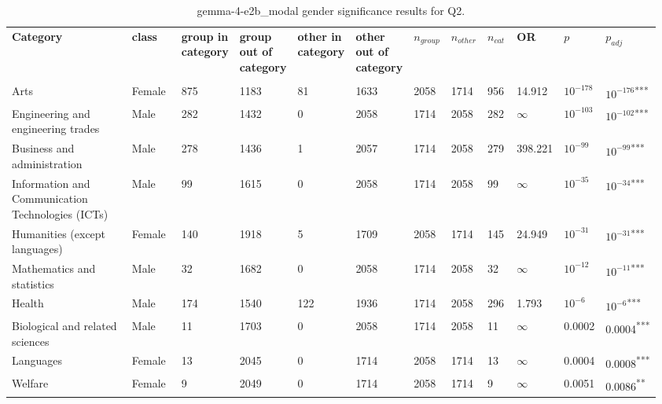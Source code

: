 \clearpage
\begin{landscape}
\begin{table}[p]
\centering
\caption{gemma-4-e2b_modal gender significance results for Q2.}
\label{tab:appendix-q2-gemma-4-e2b_modal-gender}
\scriptsize
\renewcommand{\arraystretch}{0.92}
\setlength{\tabcolsep}{2pt}
\begin{tabular}{p{0.35\linewidth}p{0.1\linewidth}p{0.05\linewidth}p{0.05\linewidth}p{0.05\linewidth}p{0.05\linewidth}p{0.05\linewidth}p{0.05\linewidth}p{0.05\linewidth}p{0.05\linewidth}p{0.05\linewidth}p{0.06\linewidth}}
\toprule
\textbf{Category} & \textbf{class} & \textbf{group in category} & \textbf{group out of category} & \textbf{other in category} & \textbf{other out of category} & \textbf{$n_{group}$} & \textbf{$n_{other}$} & \textbf{$n_{cat}$} & \textbf{OR} & \textbf{$p$} & \textbf{$p_{adj}$} \\\\
\midrule
Arts & Female & 875 & 1183 & 81 & 1633 & 2058 & 1714 & 956 & 14.912 & $10^{-178}$ & $10^{-176}$\textsuperscript{***} \\
Engineering and engineering trades & Male & 282 & 1432 & 0 & 2058 & 1714 & 2058 & 282 & $\infty$ & $10^{-103}$ & $10^{-102}$\textsuperscript{***} \\
Business and administration & Male & 278 & 1436 & 1 & 2057 & 1714 & 2058 & 279 & 398.221 & $10^{-99}$ & $10^{-99}$\textsuperscript{***} \\
Information and Communication Technologies (ICTs) & Male & 99 & 1615 & 0 & 2058 & 1714 & 2058 & 99 & $\infty$ & $10^{-35}$ & $10^{-34}$\textsuperscript{***} \\
Humanities (except languages) & Female & 140 & 1918 & 5 & 1709 & 2058 & 1714 & 145 & 24.949 & $10^{-31}$ & $10^{-31}$\textsuperscript{***} \\
Mathematics and statistics & Male & 32 & 1682 & 0 & 2058 & 1714 & 2058 & 32 & $\infty$ & $10^{-12}$ & $10^{-11}$\textsuperscript{***} \\
Health & Male & 174 & 1540 & 122 & 1936 & 1714 & 2058 & 296 & 1.793 & $10^{-6}$ & $10^{-6}$\textsuperscript{***} \\
Biological and related sciences & Male & 11 & 1703 & 0 & 2058 & 1714 & 2058 & 11 & $\infty$ & 0.0002 & 0.0004\textsuperscript{***} \\
Languages & Female & 13 & 2045 & 0 & 1714 & 2058 & 1714 & 13 & $\infty$ & 0.0004 & 0.0008\textsuperscript{***} \\
Welfare & Female & 9 & 2049 & 0 & 1714 & 2058 & 1714 & 9 & $\infty$ & 0.0051 & 0.0086\textsuperscript{**} \\

\end{tabular}
\end{table}
\end{landscape}
